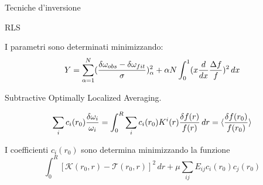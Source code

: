 \documentclass[10pt,xcolor={usenames},fleqn,mathserif,serif]{beamer}
\begin{document}
\begin{frame}{Tecniche d'inversione}

\begin{block}{RLS}

I parametri sono determinati minimizzando:
\begin{equation*}
Y=\sum_{\alpha=1}^N(\frac{\delta\omega_{obs}-\delta\omega_{fit}}{\sigma})^2_{\alpha}+\alpha N\int_0^1(x\frac{d}{d x}\frac{\Delta f}{f})^2\,dx
\end{equation*}

\end{block}

\begin{block}{Subtractive Optimally Localized Averaging.}

\begin{equation*}
\sum_ic_i(r_0)\frac{\delta\omega_i}{\omega_i}=\int_0^R\sum_ic_i(r_0)K^i(r)\frac{\delta f(r)}{f(r)}\,dr=\langle \frac{\delta f(r_0)}{f(r_0)} \rangle
\end{equation*}

I coefficienti $c_i(r_0)$ sono determina minimizzando la funzione
\begin{equation*}
\int_0^R[\mathcal{K}(r_0,r)-\mathcal{T}(r_0,r)]^2\,dr+\mu\sum_{ij}E_{ij}c_i(r_0)c_j(r_0)
\end{equation*}

\end{block}

\end{frame}
\end{document}
